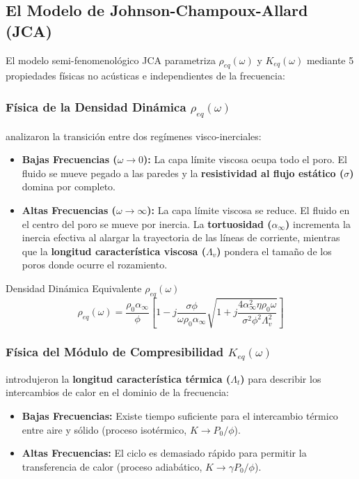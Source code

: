 \documentclass[11pt,a4paper]{article}
\begin{document}
\subsection{El Modelo de Johnson-Champoux-Allard (JCA)}
El modelo semi-fenomenológico JCA parametriza $\rho_{eq}(\omega)$ y $K_{eq}(\omega)$ mediante 5 propiedades físicas no acústicas e independientes de la frecuencia:

\subsubsection{\texorpdfstring{Física de la Densidad Dinámica $\rho_{eq}(\omega)$}{Física de la Densidad Dinámica rho\_eq(omega)}}
\citet{johnson1987} analizaron la transición entre dos regímenes visco-inerciales:
\begin{itemize}
\item \textbf{Bajas Frecuencias ($\omega \to 0$):} La capa límite viscosa ocupa todo el poro. El fluido se mueve pegado a las paredes y la \textbf{resistividad al flujo estático ($\sigma$)} domina por completo.
\item \textbf{Altas Frecuencias ($\omega \to \infty$):} La capa límite viscosa se reduce. El fluido en el centro del poro se mueve por inercia. La \textbf{tortuosidad ($\alpha_\infty$)} incrementa la inercia efectiva al alargar la trayectoria de las líneas de corriente, mientras que la \textbf{longitud característica viscosa ($\Lambda_v$)} pondera el tamaño de los poros donde ocurre el rozamiento.
\end{itemize}

\begin{infobox}{\texorpdfstring{Densidad Dinámica Equivalente $\rho_{eq}(\omega)$ \citep{johnson1987}}{Densidad Dinámica Equivalente rho\_eq(omega)}}
\begin{equation}
\rho_{eq}(\omega) = \frac{\rho_0 \alpha_\infty}{\phi} \left[ 1 - j \frac{\sigma \phi}{\omega \rho_0 \alpha_\infty} \sqrt{1 + j \frac{4 \alpha_\infty^2 \eta \rho_0 \omega}{\sigma^2 \phi^2 \Lambda_v^2}} \right]
\end{equation}
\end{infobox}

\subsubsection{\texorpdfstring{Física del Módulo de Compresibilidad $K_{eq}(\omega)$}{Física del Módulo de Compresibilidad K\_eq(omega)}}
\citet{champoux1991} introdujeron la \textbf{longitud característica térmica ($\Lambda_t$)} para describir los intercambios de calor en el dominio de la frecuencia:
\begin{itemize}
\item \textbf{Bajas Frecuencias:} Existe tiempo suficiente para el intercambio térmico entre aire y sólido (proceso isotérmico, $K \to P_0/\phi$).
\item \textbf{Altas Frecuencias:} El ciclo es demasiado rápido para permitir la transferencia de calor (proceso adiabático, $K \to \gamma P_0/\phi$).
\end{itemize}
\end{document}
